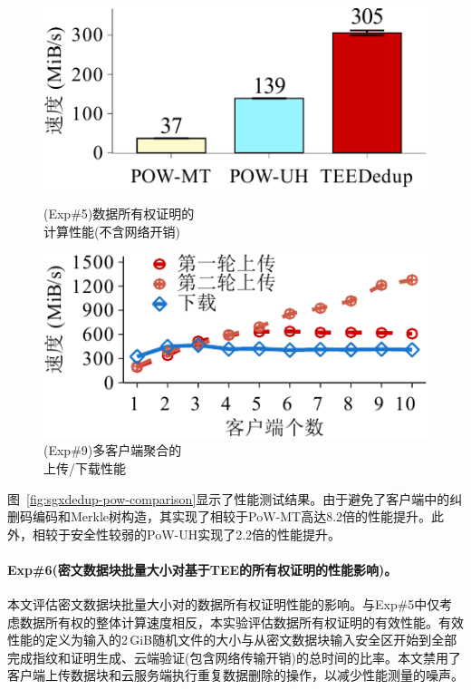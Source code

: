\begin{figure}[!htb]
    \begin{minipage}[t]{0.47\textwidth}
        \centering
        \includegraphics[width=\linewidth]{pic/sgxdedup/plot/exp_a4/expa4_powPerformance.pdf}
        \caption{\small(Exp\#5)数据所有权证明的\\计算性能(不含网络开销)}
        \label{fig:sgxdedup-pow-comparison}
    \end{minipage}%
    \hspace{0.2in}
    \begin{minipage}[t]{0.47\textwidth}
        \centering
        \includegraphics[width=\linewidth]{pic/sgxdedup/plot/exp_b1/expb1_multiple_client.pdf}
        \caption{(Exp\#9)多客户端聚合的\\上传/下载性能}
        \label{fig:sgxdedup-multiClientThroughput}
    \end{minipage}%
\end{figure}

图~\ref{fig:sgxdedup-pow-comparison}显示了性能测试结果。由于\sysnameS 避免了客户端中的纠删码编码和Merkle树构造，其实现了相较于PoW-MT高达8.2倍的性能提升。此外，\sysnameS 相较于安全性较弱的PoW-UH实现了2.2倍的性能提升。

\paragraph*{Exp\#6(密文数据块批量大小对基于TEE的所有权证明的性能影响)。}本文评估密文数据块批量大小对\sysnameS 的数据所有权证明性能的影响。与Exp\#5中仅考虑数据所有权的整体计算速度相反，本实验评估数据所有权证明的有效性能。有效性能的定义为输入的2\,GiB随机文件的大小与从密文数据块输入安全区开始到全部完成指纹和证明生成、云端验证(包含网络传输开销)的总时间的比率。本文禁用了客户端上传数据块和云服务端执行重复数据删除的操作，以减少性能测量的噪声。


